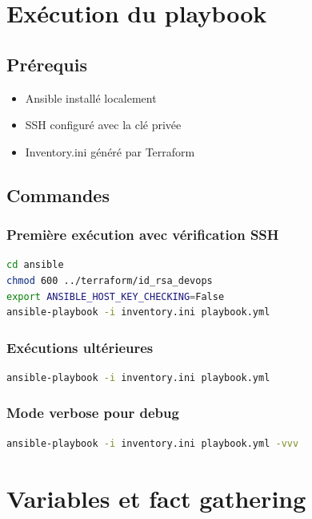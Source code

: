 \documentclass[12pt,a4paper,twoside]{report}
\begin{document}
\section{Exécution du playbook}

\subsection{Prérequis}

\begin{itemize}
    \item Ansible installé localement
    \item SSH configuré avec la clé privée
    \item Inventory.ini généré par Terraform
\end{itemize}

\subsection{Commandes}

\subsubsection{Première exécution avec vérification SSH}

\begin{lstlisting}[language=bash]
cd ansible
chmod 600 ../terraform/id_rsa_devops
export ANSIBLE_HOST_KEY_CHECKING=False
ansible-playbook -i inventory.ini playbook.yml
\end{lstlisting}

\subsubsection{Exécutions ultérieures}

\begin{lstlisting}[language=bash]
ansible-playbook -i inventory.ini playbook.yml
\end{lstlisting}

\subsubsection{Mode verbose pour debug}

\begin{lstlisting}[language=bash]
ansible-playbook -i inventory.ini playbook.yml -vvv
\end{lstlisting}

\section{Variables et fact gathering}
\end{document}
